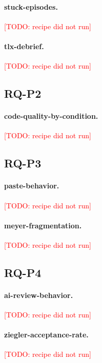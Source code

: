\documentclass[11pt]{article}
\newcommand{\todo}[1]{\textcolor{red}{[TODO: #1]}}
\begin{document}
\paragraph{stuck-episodes.} \todo{recipe did not run}

\paragraph{tlx-debrief.} \todo{recipe did not run}

\subsection{RQ-P2}

\paragraph{code-quality-by-condition.} \todo{recipe did not run}

\subsection{RQ-P3}

\paragraph{paste-behavior.} \todo{recipe did not run}

\paragraph{meyer-fragmentation.} \todo{recipe did not run}

\subsection{RQ-P4}

\paragraph{ai-review-behavior.} \todo{recipe did not run}

\paragraph{ziegler-acceptance-rate.} \todo{recipe did not run}
\end{document}
